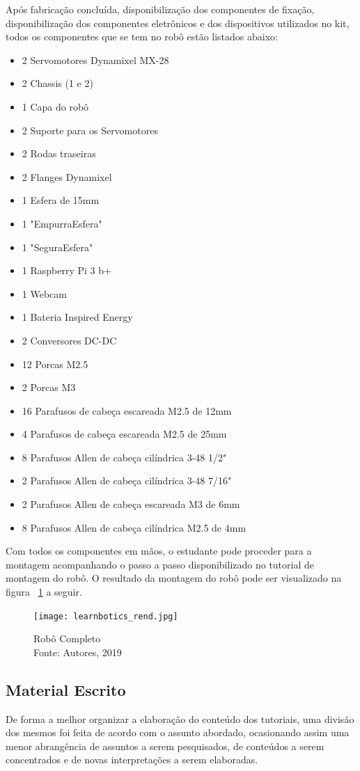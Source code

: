 Após fabricação concluída, disponibilização dos componentes de fixação, disponibilização dos componentes eletrônicos e dos dispositivos utilizados no kit, todos os componentes que se tem no robô estão listados abaixo:
\begin{itemize}
	\item 2 Servomotores Dynamixel MX-28
	\item 2 Chassis (1 e 2)
	\item 1 Capa do robô
	\item 2 Suporte para os Servomotores
	\item 2 Rodas traseiras
	\item 2 Flanges Dynamixel
	\item 1 Esfera de 15mm
	\item 1 "EmpurraEsfera"
	\item 1 "SeguraEsfera"
	\item 1 Raspberry Pi 3 b+
	\item 1 Webcam
	\item 1 Bateria Inspired Energy
	\item 2 Conversores DC-DC
	\item 12 Porcas M2.5
	\item 2 Porcas M3
	\item 16 Parafusos de cabeça escareada M2.5 de 12mm
	\item 4 Parafusos de cabeça escareada M2.5 de 25mm
	\item 8 Parafusos Allen de cabeça cilíndrica 3-48 1/2"
	\item 2 Parafusos Allen de cabeça cilíndrica 3-48 7/16"
	\item 2 Parafusos Allen de cabeça escareada M3 de 6mm
	\item 8 Parafusos Allen de cabeça cilíndrica M2.5 de 4mm
\end{itemize}
Com todos os componentes em mãos, o estudante pode proceder para a montagem acompanhando o passo a passo disponibilizado no tutorial de montagem do robô. O resultado da montagem do robô pode ser visualizado na figura ~\ref{fig:learnbotics_rend} a seguir.
\begin{figure}[h!]
	\centering
	\texttt{[image: learnbotics\_rend.jpg]}\\
	\caption{Robô Completo \\ Fonte: Autores, 2019}
	\label{fig:learnbotics_rend}
\end{figure}

\subsection{Material Escrito}
De forma a melhor organizar a elaboração do conteúdo dos tutoriais, uma divisão dos mesmos foi feita de acordo com o assunto abordado, ocasionando assim uma menor abrangência de assuntos a serem pesquisados, de conteúdos a serem concentrados e de novas interpretações a serem elaboradas.

